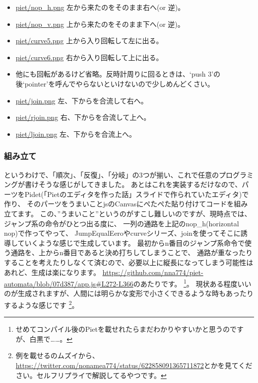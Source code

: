 \documentclass[twocolumn,8pt,b5paper]{extarticle}
\begin{document}
\begin{itemize}
\setlength{\parskip}{0cm}
\setlength{\itemsep}{0cm}
\item \href{https://github.com/nna774/piet-automata/blob/master/piet/nop\_h.png}{piet/nop\_h.png} 左から来たのをそのまま右へ(or 逆)。
\item \href{https://github.com/nna774/piet-automata/blob/master/piet/nop\_v.png}{piet/nop\_v.png} 上から来たのをそのまま下へ(or 逆)。
\item \href{https://github.com/nna774/piet-automata/blob/master/piet/curve5.png}{piet/curve5.png} 上から入り回転して左に出る。
\item \href{https://github.com/nna774/piet-automata/blob/master/piet/curve6.png}{piet/curve6.png} 右から入り回転して上に出る。
\item 他にも回転があるけど省略。反時計周りに回るときは、`push 3'の後`pointer'を呼んでやらないといけないので少しめんどくさい。
\item \href{https://github.com/nna774/piet-automata/blob/master/piet/join.png}{piet/join.png} 左、下からを合流して右へ。
\item \href{https://github.com/nna774/piet-automata/blob/master/piet/rjoin.png}{piet/rjoin.png} 右、下からを合流して上へ。
\item \href{https://github.com/nna774/piet-automata/blob/master/piet/ljoin.png}{piet/ljoin.png} 左、下からを合流上へ。
\end{itemize}

\subsubsection{組み立て}
というわけで、「順次」、「反復」、「分岐」の3つが揃い、これで任意のプログラミングが書けそうな感じがしてきました。
あとはこれを実装するだけなので、パーツをPidet(「Pietのエディタを作った話」スライドで作られていたエディタ)で作り、
そのパーツをうまいことjsのCanvasにぺたぺた貼り付けてコードを組み立てます。
この、”うまいこと”というのがすこし難しいのですが、現時点では、ジャンプ系の命令がひとつ出る度に、
一列の通路を上記のnop\_h(horizontal nop)で作ってやって、
JumpEqualEeroやcurveシリーズ、joinを使ってそこに誘導していくような感じで生成しています。
最初からn番目のジャンプ系命令で使う通路を、上からn番目であると決め打ちしてしまうことで、
通路が重なったりすることを考えたりしなくて済むので、必要以上に縦長になってしまう可能性はあれど、生成は楽になります。
\url{https://github.com/nna774/piet-automata/blob/07d387/app.js#L272-L366}のあたりです。
\footnote{せめてコンパイル後のPietを載せれたらまだわかりやすいかと思うのですが、白黒で……。}。
現状ある程度いいのが生成されますが、人間には明らかな変形で小さくできるような時もあったりするような感じです
\footnote{例を載せるのムズイから、\url{https://twitter.com/nonamea774/status/622858091365711872}とかを見てください。セルフリプライで解説してるやつです。}。
\end{document}
